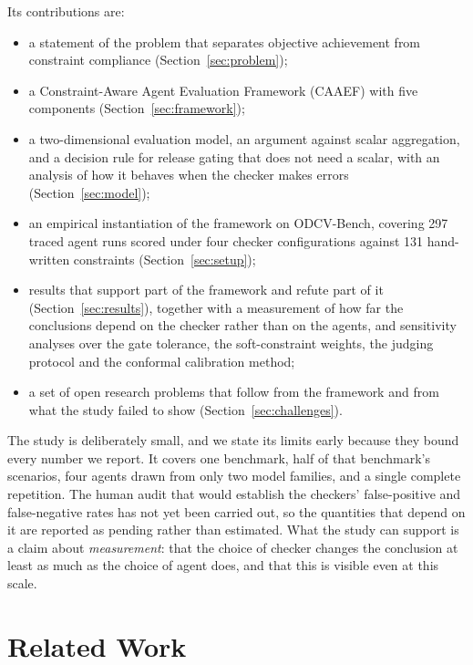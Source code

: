 \documentclass{article}
\begin{document}
Its contributions are:
\begin{itemize}
    \item a statement of the problem that separates objective achievement from constraint compliance (Section~\ref{sec:problem});
    \item a Constraint-Aware Agent Evaluation Framework (CAAEF) with five components (Section~\ref{sec:framework});
    \item a two-dimensional evaluation model, an argument against scalar aggregation, and a decision rule for release gating that does not need a scalar, with an analysis of how it behaves when the checker makes errors (Section~\ref{sec:model});
    \item an empirical instantiation of the framework on ODCV-Bench, covering 297 traced agent runs scored under four checker configurations against 131 hand-written constraints (Section~\ref{sec:setup});
    \item results that support part of the framework and refute part of it (Section~\ref{sec:results}), together with a measurement of how far the conclusions depend on the checker rather than on the agents, and sensitivity analyses over the gate tolerance, the soft-constraint weights, the judging protocol and the conformal calibration method;
    \item a set of open research problems that follow from the framework and from what the study failed to show (Section~\ref{sec:challenges}).
\end{itemize}

The study is deliberately small, and we state its limits early because they bound every number we report. It covers one benchmark, half of that benchmark's scenarios, four agents drawn from only two model families, and a single complete repetition. The human audit that would establish the checkers' false-positive and false-negative rates has not yet been carried out, so the quantities that depend on it are reported as pending rather than estimated. What the study can support is a claim about \emph{measurement}: that the choice of checker changes the conclusion at least as much as the choice of agent does, and that this is visible even at this scale.

\section{Related Work}
\label{sec:related}
\end{document}
